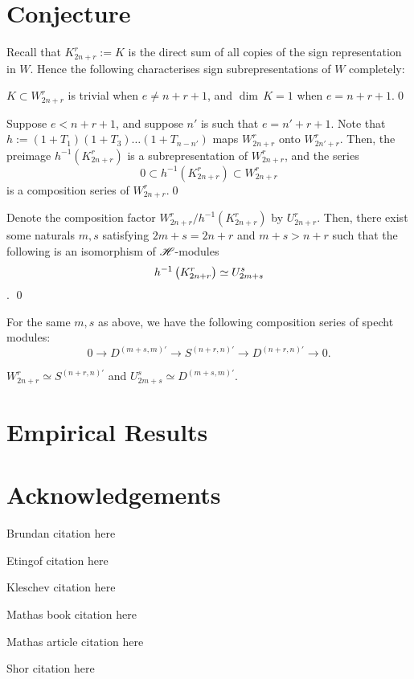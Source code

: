 \documentclass{amsart}
\begin{document}
\section{Conjecture}
Recall that $K_{2n + r}^r := K$ is the direct sum of all copies of the sign representation in $W$.
Hence the following characterises sign subrepresentations of $W$ completely:
\begin{proposition}
  $K \subset W_{2n + r}^r$ is trivial when $e \neq n + r + 1$, and $\dim \, K = 1$ when $e = n + r + 1$.\qed
\end{proposition} 
\begin{proposition}
  Suppose $e < n + r + 1$, and suppose $n'$ is such that $e = n' + r + 1$.
  Note that $h := (1 + T_1)(1 + T_3)\dots(1 + T_{n - n'})$ maps $W_{2n + r}^r$ onto $W_{2n' + r}^r$.
  Then, the preimage $h^{-1}(K_{2n + r}^r)$ is a subrepresentation of $W_{2n + r}^r$, and the series
  \[
    0 \subset h^{-1}(K_{2n + r}^r) \subset W_{2n + r}^r
  \]
  is a composition series of $W_{2n + r}^r$.\qed
\end{proposition}
\begin{proposition}
  Denote the composition factor $W_{2n + r}^r / h^{-1}(K_{2n + r}^r)$ by $U_{2n + r}^r$.
  Then, there exist some naturals $m,s$ satisfying $2m + s = 2n + r$ and $m + s > n + r$ such that the following is an isomorphism of $\mathscr{H}$-modules \[h^{-1}\left( K_{2n + r}^r \right) \simeq U_{2m + s}^s\].
  \qed
\end{proposition}
\begin{proposition}
  For the same $m,s$ as above, we have the following composition series of specht modules:
  \[
    0 \longrightarrow D^{(m+s,m)'} \longrightarrow S^{(n+r,n)'} \longrightarrow D^{(n+r,n)'} \longrightarrow 0.
  \]
\end{proposition}
\begin{proposition}
  $W_{2n + r}^r \simeq S^{(n+r,n)'}$ and $U_{2m +s}^s \simeq D^{(m+s,m)'}$.
\end{proposition}

\section{Empirical Results}

\section{Acknowledgements}

\begin{thebibliography}{9}

  Brundan citation here

  Etingof citation here

  Kleschev citation here

  Mathas book citation here

  Mathas article citation here

  Shor citation here

\end{thebibliography}
\end{document}
